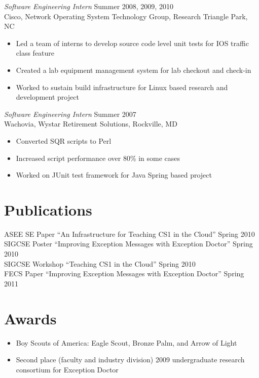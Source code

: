 \documentclass[line,margin]{res}
\begin{document}
\begin{resume}
        {\sl Software Engineering Intern} \hfill  Summer 2008, 2009, 2010 \\
           Cisco, Network Operating System Technology Group, Research Triangle Park, NC
              \begin{itemize}  \itemsep -2pt %
                   \item Led a team of interns to develop source code level unit
                     tests for IOS traffic class feature
                   \item Created a lab equipment management system for lab checkout and check-in
                   \item Worked to sustain build infrastructure for Linux
                     based research and development project
              \end{itemize}
        {\sl Software Engineering Intern} \hfill  Summer 2007 \\
           Wachovia, Wystar Retirement Solutions, Rockville, MD
              \begin{itemize}  \itemsep -2pt %
                   \item Converted SQR scripts to Perl
                   \item Increased script performance over 80\% in some cases
                   \item Worked on JUnit test framework for Java Spring based project
              \end{itemize} 

\section{Publications}
ASEE SE Paper ``An Infrastructure for Teaching CS1 in the Cloud'' Spring 2010 \\
SIGCSE Poster ``Improving Exception Messages with Exception Doctor'' Spring 2010 \\
SIGCSE Workshop ``Teaching CS1 in the Cloud'' Spring 2010 \\
FECS Paper ``Improving Exception Messages with Exception Doctor'' Spring 2011

\section{Awards}
\begin{itemize}  \itemsep -2pt %
\item Boy Scouts of America: Eagle Scout, Bronze Palm, and Arrow of Light
\item Second place (faculty and industry division) 2009 undergraduate research consortium for Exception Doctor
\end{itemize}
\end{resume}
\end{document}
